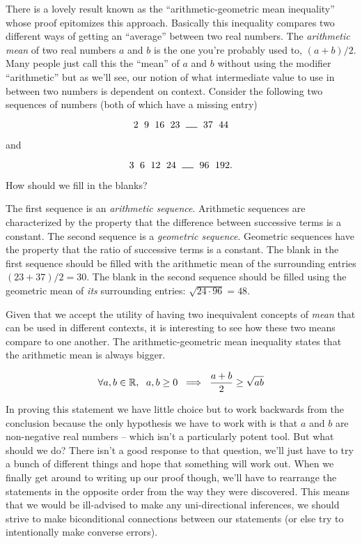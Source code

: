 There is a lovely result known as the 
``arithmetic-geometric mean inequality''
whose proof epitomizes this approach.  Basically this inequality compares two
different ways of getting an ``average'' between two real numbers.  The 
\emph{arithmetic mean} of two real numbers $a$ and $b$ is the one you're 
probably used to, $(a+b)/2$.   Many people just call this the ``mean''
of $a$ and $b$ without using the modifier ``arithmetic'' but as we'll
see, our notion of what intermediate value to use in between two numbers
is dependent on context.  Consider the following two sequences of numbers
(both of which have a missing entry) 

\[ 2 \rule{6pt}{0pt} 9  \rule{6pt}{0pt} 16  \rule{6pt}{0pt} 23  \rule{6pt}{0pt} \rule{12pt}{.5pt}  \rule{6pt}{0pt} 37  \rule{6pt}{0pt} 44 \]

\noindent and

\[ 3 \rule{6pt}{0pt} 6  \rule{6pt}{0pt} 12  \rule{6pt}{0pt} 24  \rule{6pt}{0pt} \rule{12pt}{.5pt}  \rule{6pt}{0pt} 96  \rule{6pt}{0pt} 192. \]

\noindent How should we fill in the blanks?

The first sequence is an 
\emph{arithmetic sequence}.  
Arithmetic sequences 
are characterized by the property that the difference between successive
terms is a constant.  The second sequence is a 
\emph{geometric sequence}. 
Geometric sequences have the property that the ratio of successive terms 
is a constant.  The blank in the first sequence should be filled with the 
arithmetic mean of the surrounding entries $(23+37)/2 = 30$.  The blank 
in the second sequence should be filled using the 
geometric mean
of \emph{its} surrounding entries: $\sqrt{24\cdot 96} = 48$.

Given that we accept the utility of having two inequivalent concepts
of \emph{mean} that can be used in different contexts, it is interesting
to see how these two means compare to one another.  The 
arithmetic-geometric mean inequality states that the arithmetic mean 
is always bigger.

\[ \forall a,b \in \Reals, \rule{6pt}{0pt}  a,b \geq 0 \; \implies \;  \frac{a+b}{2} \geq \sqrt{ab} \]

In proving this statement we have little choice but to work backwards
from the conclusion because the only hypothesis we have to work with
is that $a$ and $b$ are non-negative real numbers -- which isn't a 
particularly potent tool. But what should we do?  
There isn't a good response to that 
question, we'll just have to try a bunch of different things and hope
that something will work out.  When we finally get around to writing up
our proof though, we'll have to rearrange the statements in the opposite 
order from the way they were discovered.  This means that we would 
be ill-advised to make any uni-directional inferences, we should 
strive to make biconditional connections between our statements
(or else try to intentionally make converse errors).

